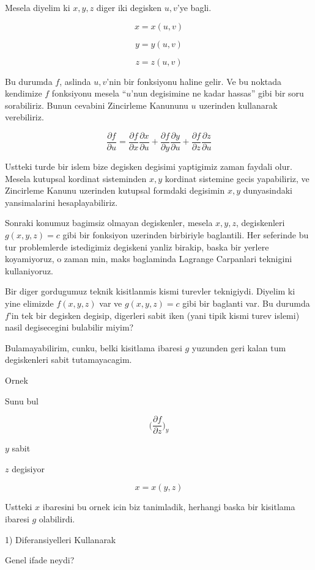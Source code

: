 \documentclass[12pt,fleqn]{article}\usepackage{../common}
\begin{document}
Mesela diyelim ki $x,y,z$ diger iki degisken $u,v$'ye bagli. 

\[ x = x(u,v) \]

\[ y = y(u,v) \]

\[ z = z(u,v) \]

Bu durumda $f$, aslinda $u,v$'nin bir fonksiyonu haline gelir. Ve bu
noktada kendimize $f$ fonksiyonu mesela ``$u$'nun degisimine ne kadar
hassas'' gibi bir soru sorabiliriz. Bunun cevabini Zincirleme Kanununu $u$
uzerinden kullanarak verebiliriz.

\[ 
\frac{\partial f}{\partial u} = 
\frac{\partial f}{\partial x}\frac{\partial x}{\partial u} + 
\frac{\partial f}{\partial y}\frac{\partial y}{\partial u} + 
\frac{\partial f}{\partial z}\frac{\partial z}{\partial u} 
 \]

Ustteki turde bir islem bize degisken degisimi yaptigimiz zaman faydali
olur. Mesela kutupsal kordinat sisteminden $x,y$ kordinat sistemine gecis
yapabiliriz, ve Zincirleme Kanunu uzerinden kutupsal formdaki degisimin $x,y$
dunyasindaki yansimalarini hesaplayabiliriz. 

Sonraki konumuz bagimsiz olmayan degiskenler, mesela $x,y,z$, degiskenleri
$g(x,y,z)=c$ gibi bir fonksiyon uzerinden birbiriyle baglantili. Her
seferinde bu tur problemlerde istedigimiz degiskeni yanliz birakip, baska
bir yerlere koyamiyoruz, o zaman min, maks baglaminda Lagrange Carpanlari
teknigini kullaniyoruz.

Bir diger gordugumuz teknik kisitlanmis kismi turevler teknigiydi. Diyelim
ki yine elimizde $f(x,y,z)$ var ve $g(x,y,z)=c$ gibi bir baglanti var. Bu
durumda $f$'in tek bir degisken degisip, digerleri sabit iken (yani tipik
kismi turev islemi) nasil degisecegini bulabilir miyim? 

Bulamayabilirim, cunku, belki kisitlama ibaresi $g$ yuzunden geri kalan tum
degiskenleri sabit tutamayacagim.

Ornek 

Sunu bul

\[ 
\bigg( 
\frac{\partial f}{\partial z}
\bigg)_{y}
 \]

$y$ sabit

$z$ degisiyor

\[ x = x(y,z) \]

Ustteki $x$ ibaresini bu ornek icin biz tanimladik, herhangi baska bir
kisitlama ibaresi $g$ olabilirdi. 

1) Diferansiyelleri Kullanarak

Genel ifade neydi?
\end{document}
